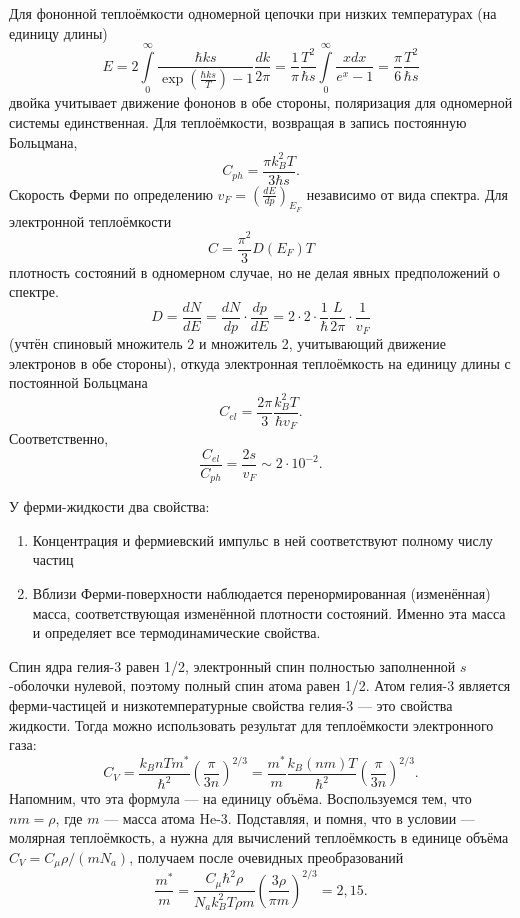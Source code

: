 \documentclass[a4paper]{article}
\begin{document}
\begin{sol}
Для фононной теплоёмкости одномерной цепочки
при низких температурах (на единицу длины)
\[
E= 2 \int\limits_{0}^{\infty} \frac{\hbar k s}{
\exp \left( \frac{\hbar  k s}{T} \right) -1}
\frac{dk}{2\pi}= \frac{1}{\pi}
\frac{T^2}{\hbar  s} \int\limits_{0}^{\infty} 
\frac{xdx}{e^x -1}= \frac{\pi}{6} \frac{T^2}{\hbar s}
\]
двойка учитывает движение фононов в обе
стороны, поляризация для одномерной системы
единственная. Для теплоёмкости, возвращая
в запись постоянную Больцмана,
\[
C_{ph}= \frac{\pi k_B^2 T}{3\hbar  s}
.\] 
Скорость Ферми по определению $v_F = \left( \frac{dE}{dp} \right) _{E_F}$ независимо от вида спектра.
Для электронной теплоёмкости
\[
	C= \frac{\pi^2}{3} D(E_F) T
\]
плотность состояний в одномерном случае,
но не делая явных предположений о спектре.
\[
D= \frac{dN}{dE}= \frac{dN}{dp} \cdot \frac{dp}{dE}=
2 \cdot 2 \cdot  \frac{1}{\hbar }\frac{L}{2\pi}
\cdot \frac{1}{v_F}
\]
(учтён спиновый множитель 2 и множитель 2,
учитывающий движение электронов в обе стороны),
откуда электронная теплоёмкость на единицу длины с
постоянной Больцмана
\[
C_{el}= \frac{2\pi}{3} \frac{k_B^2 T}{\hbar v_F}
.\] 
Соответственно,
\[
\frac{C_{el}}{C_{ph}}= \frac{2s}{v_F} \sim 2\cdot 
10^{-2}
.\] 
\end{sol}
\begin{hiProb}[3.61]
\end{hiProb}
\begin{sol}
У ферми-жидкости два свойства:
\begin{enumerate}
\item Концентрация и фермиевский импульс в ней
	соответствуют полному числу частиц
\item  Вблизи Ферми-поверхности наблюдается
	перенормированная (изменённая) масса,
	соответствующая изменённой плотности
	состояний. Именно эта масса и определяет
	все термодинамические свойства.
\end{enumerate}
Спин ядра гелия-3 равен 1/2, электронный спин полностью заполненной $s$-оболочки нулевой,
поэтому полный спин атома равен 1/2. Атом гелия-3
является ферми-частицей и низкотемпературные свойства
гелия-3 --- это свойства жидкости. Тогда можно
использовать результат для теплоёмкости
электронного газа:
\[
C_V= \frac{k_B n T m^*}{\hbar ^2}
\left( \frac{\pi}{3n} \right) ^{2 /3}=
\frac{m^*}{m} \frac{k_B (nm)T}{\hbar ^2}
\left( \frac{\pi}{3n} \right) ^{2 /3}
.\] 
Напомним, что эта формула --- на единицу объёма.
Воспользуемся тем, что $nm=\rho$, где $m$ --- масса
атома He-3. Подставляя, и помня, что в условии ---
молярная теплоёмкость, а нужна для вычислений
теплоёмкость в единице объёма  $C_V= C_\mu \rho
/(m N_a)$, получаем после очевидных
преобразований
\[
	\frac{m^*}{m}=\frac{C_\mu \hbar ^2 \rho}{
	N_a k_B^2 T\rho m} \left( \frac{3\rho}{\pi m} \right) ^{2 /3}=2,15
.\] 
\end{sol}
\end{document}
